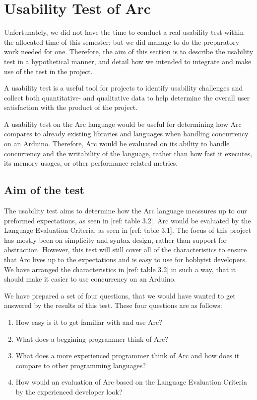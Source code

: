 \section{Usability Test of Arc}\label{subsec:usabilityTestOfArc}

Unfortunately, we did not have the time to conduct a real usability test within the allocated time of this semester; but we did manage to do the preparatory work needed for one. Therefore, the aim of this section is to describe the usability test in a hypothetical manner, and detail how we intended to integrate and make use of the test in the project.

A usability test is a useful tool for projects to identify usability challenges and collect both quantitative- and qualitative data to help determine the overall user satisfaction with the product of the project.

A usability test on the Arc language would be useful for determining how Arc compares to already existing libraries and languages when handling concurrency on an Arduino. Therefore, Arc would be evaluated on its ability to handle concurrency and the writability of the language, rather than how fast it executes, its memory usages, or other performance-related metrics.

\subsection{Aim of the test}\label{subsubsec:aimOfTheTest}

The usability test aims to determine how the Arc language meassures up to our preformed expectations, as seen in [ref: table 3.2]. Arc would be evaluated by the Language Evaluation Criteria, as seen in [ref: table 3.1]. The focus of this project has mostly been on simplicity and syntax design, rather than support for abstraction. However, this test will still cover all of the characteristics to ensure that Arc lives up to the expectations and is easy to use for hobbyist developers. We have arranged the characteristics in [ref: table 3.2] in such a way, that it should make it easier to use concurrency on an Arduino.

We have prepared a set of four questions, that we would have wanted to get answered by the results of this test. These four questions are as follows:

\begin{enumerate}
    \item How easy is it to get familiar with and use Arc?
    \item What does a beggining programmer think of Arc?
    \item What does a more experienced programmer think of Arc and how does it compare to other programming languages?
    \item How would an evaluation of Arc based on the Language Evaluation Criteria by the experienced developer look?
\end{enumerate}

